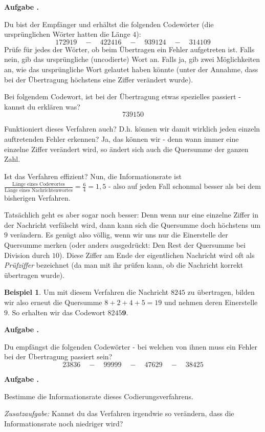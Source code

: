 \documentclass[a4paper,ngerman,12pt]{scrartcl}
\theoremstyle{definition}
\newtheorem{bsp}[defn]{Beispiel}
\theoremstyle{plain}
\theoremstyle{remark}
\newlength{\aufgabenskip}
\newcounter{aufgabennummer}
\newenvironment{aufgabe}[1]{
	\addtocounter{aufgabennummer}{1}
	\textbf{Aufgabe \theaufgabennummer.} \emph{#1} \par
}{\vspace{\aufgabenskip}}
\begin{document}
\begin{aufgabe}{}
	Du bist der Empfänger und erhältst die folgenden Codewörter (die ursprünglichen Wörter hatten die Länge $4$):
		\[172919 \quad-\quad 422416 \quad-\quad 939124  \quad-\quad 314109\]
	Prüfe für jedes der Wörter, ob beim Übertragen ein Fehler aufgetreten ist. Falls nein, gib das ursprüngliche (uncodierte) Wort an. Falls ja, gib zwei Möglichkeiten an, wie das ursprüngliche Wort gelautet haben könnte (unter der Annahme, dass bei der Übertragung höchstens eine Ziffer verändert wurde). 
	
	Bei folgendem Codewort, ist bei der Übertragung etwas spezielles passiert - kannst du erklären was?
		\[739150\]
\end{aufgabe}

Funktioniert dieses Verfahren auch? D.h. können wir damit wirklich jeden einzeln auftretenden Fehler erkennen? Ja, das können wir - denn wann immer eine einzelne Ziffer verändert wird, so ändert sich auch die Quersumme der ganzen Zahl. 

Ist das Verfahren effizient? Nun, die Informationsrate ist $\frac{\text{Länge eines Codewortes}}{\text{Länge eines Nachrichtenwortes}} = \frac{6}{4} = 1,5$ - also auf jeden Fall schonmal besser als bei dem bisherigen Verfahren.

Tatsächlich geht es aber sogar noch besser: Denn wenn nur eine einzelne Ziffer in der Nachricht verfälscht wird, dann kann sich die Quersumme doch höchstens um $9$ verändern. Es genügt also völlig, wenn wir uns nur die Einerstelle der Quersumme merken (oder anders ausgedrückt: Den Rest der Quersumme bei Division durch $10$). Diese Ziffer am Ende der eigentlichen Nachricht wird oft als \emph{Prüfziffer} bezeichnet (da man mit ihr prüfen kann, ob die Nachricht korrekt übertragen wurde).

\begin{bsp}
	Um mit diesem Verfahren die Nachricht $8245$ zu übertragen, bilden wir also erneut die Quersumme $8+2+4+5=19$ und nehmen deren Einerstelle $9$. So erhalten wir das Codewort $8245\textbf{9}$.
\end{bsp}

\begin{aufgabe}{}
	Du empfängst die folgenden Codewörter - bei welchen von ihnen muss ein Fehler bei der Übertragung passiert sein?
		\[23836 \quad-\quad 99999 \quad-\quad 47629 \quad-\quad 38425\]
\end{aufgabe}

\begin{aufgabe}{}
	Bestimme die Informationsrate dieses Codierungsverfahrens.

	\emph{Zusatzaufgabe:} Kannst du das Verfahren irgendwie so verändern, dass die Informationsrate noch niedriger wird?
\end{aufgabe}
\end{document}
